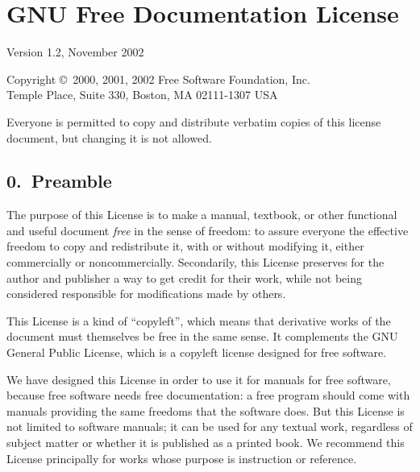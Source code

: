 %
%
%
%


\chapter*{GNU Free Documentation License}

Version 1.2, November 2002

Copyright \copyright\ 2000, 2001, 2002  Free Software Foundation, Inc.\\
 Temple Place, Suite 330, Boston, MA  02111-1307 USA

Everyone is permitted to copy and distribute verbatim copies
of this license document, but changing it is not allowed.



\section*{0.\ Preamble}

The purpose of this License is to make a manual, textbook, or other
functional and useful document \textsl{free} in the sense of freedom:
to assure everyone the effective freedom to copy and redistribute it,
with or without modifying it, either commercially or noncommercially.
Secondarily, this License preserves for the author and publisher a way
to get credit for their work, while not being considered responsible
for modifications made by others.

This License is a kind of ``copyleft'', which means that derivative
works of the document must themselves be free in the same sense. It
complements the GNU General Public License, which is a copyleft
license designed for free software.

We have designed this License in order to use it for manuals for free
software, because free software needs free documentation: a free
program should come with manuals providing the same freedoms that the
software does. But this License is not limited to software manuals; it
can be used for any textual work, regardless of subject matter or
whether it is published as a printed book. We recommend this License
principally for works whose purpose is instruction or reference.



